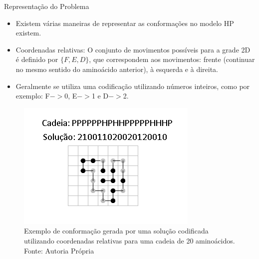 \begin{frame}[allowframebreaks]{Representação do Problema}
	
	\begin{itemize}
		\item Existem várias maneiras de representar as conformações no modelo HP existem.
		\item 	Coordenadas relativas: O conjunto de movimentos possíveis para a grade 2D é definido por $\{F,E,D\}$, que correspondem aos movimentos: frente (continuar no mesmo sentido do aminoácido anterior), à esquerda e à direita. 
		\item Geralmente se utiliza uma codificação utilizando números inteiros, como por exemplo:  F$->$0, E$->$1 e D$->$2. 
	\end{itemize}
	
	\begin{figure}[!htb]
		\centering
		\includegraphics[scale=.8]{figuras/ExemploCodificacao.png}
		\caption{Exemplo de conformação gerada por uma solução codificada utilizando coordenadas relativas para uma cadeia de 20 aminoácidos.  Fonte: Autoria Própria }
		\label{fig:exemploCodificacao}
	\end{figure}



	
\end{frame}

	
